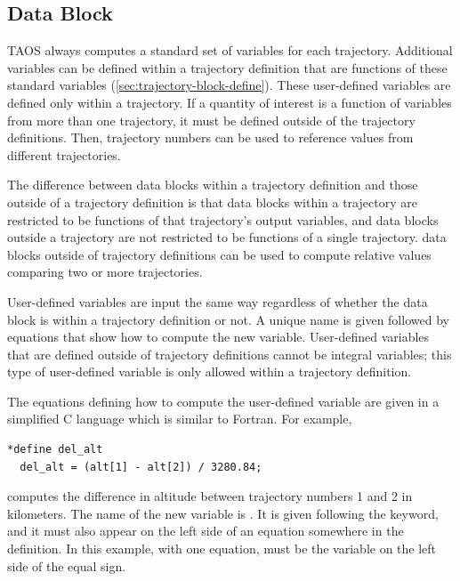 \subsection{ Data Block}\label{sec:problem-block-define}

TAOS always computes a standard set of variables for each trajectory. Additional
variables can be defined within a trajectory definition that are functions of these
standard variables (\cref{sec:trajectory-block-define}). These user-defined
variables are defined only within a trajectory. If a quantity of interest is a function
of variables from more than one trajectory, it must be defined outside of the
trajectory definitions. Then, trajectory numbers can be used to reference values
from different trajectories.

The difference between  data blocks within a trajectory
definition and those outside of a trajectory definition is that
 data blocks within a trajectory are restricted to be
functions of that trajectory's output variables, and data blocks outside a trajectory
are not restricted to be functions of a single trajectory.
 data blocks outside of trajectory definitions can be used to
compute relative values comparing two or more trajectories.

User-defined variables are input the same way regardless of whether the
 data block is within a trajectory definition or not. A unique
name is given followed by equations that show how to compute the new variable.
User-defined variables that are defined outside of trajectory definitions cannot be
integral variables; this type of user-defined variable is only allowed within a
trajectory definition.

The equations defining how to compute the user-defined variable are given in a
simplified C language which is similar to Fortran. For example,

\begin{lstlisting}[style=taosmanual]
*define del_alt
  del_alt = (alt[1] - alt[2]) / 3280.84;
\end{lstlisting}

computes the difference in altitude between trajectory numbers 1 and 2 in
kilometers. The name of the new variable is . It is given following
the  keyword, and it must also appear on the left side of an
equation somewhere in the definition. In this example, with one equation,
 must be the variable on the left side of the equal sign.

